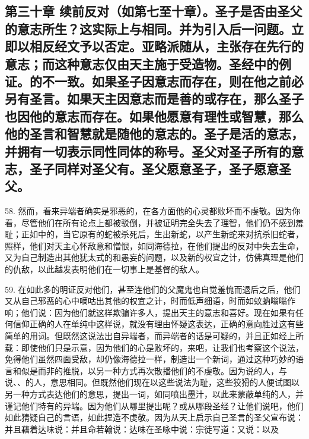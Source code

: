 
\subsection{第三十章 续前反对（如第七至十章）。圣子是否由圣父的意志所生？这实际上与相同。并为引入后一问题。立即以相反经文予以否定。亚略派随从，主张存在先行的意志；而这种意志仅由天主施于受造物。圣经中的例证。的不一致。如果圣子因意志而存在，则在他之前必另有圣言。如果天主因意志而是善的或存在，那么圣子也因他的意志而存在。如果他愿意有理性或智慧，那么他的圣言和智慧就是随他的意志的。圣子是活的意志，并拥有一切表示同性同体的称号。圣父对圣子所有的意志，圣子同样对圣父有。圣父愿意圣子，圣子愿意圣父。}

58.  然而，看来异端者确实是邪恶的，在各方面他的心灵都败坏而不虔敬。因为你看，尽管他们在所有论点上都被驳倒，并被证明完全失去了理智，他们仍不感到羞耻；正如中的，当它原有的蛇被杀死后，生出新蛇，以产生新蛇来对抗杀旧蛇者，照样，他们对天主心怀敌意和憎恨，如同海德拉，在他们提出的反对中失去生命，又为自己制造出其他犹太式的和愚妄的问题，以及新的权宜之计，仿佛真理是他们的仇敌，以此越发表明他们在一切事上是基督的敌人。\par

59. 在如此多的明证反对他们，甚至连他们的父魔鬼也自觉羞愧而退后之后，他们又从自己邪恶的心中嘀咕出其他的权宜之计，时而低声细语，时而如蚊蚋嗡嗡作响；他们说：因为他们就这样欺骗许多人，提出天主的意志和喜好。现在如果有任何信仰正确的人在单纯中这样说，就没有理由怀疑这表达，正确的意向胜过这有些简单的用词。但既然这说法出自异端者，而异端者的话是可疑的，并且正如经上所载：即使他们只是示意，因为他们的心是败坏的，来吧，让我们也考察这个说法，免得他们虽然四面受敌，却仍像海德拉一样，制造出一个新词，通过这种巧妙的语言和似是而非的推脱，以另一种方式再次散播他们的不虔敬。因为说的人，与说、、的人，意思相同。但既然他们现在以这些说法为耻，这些狡猾的人便试图以另一种方式表达他们的意思，提出一词，如同喷出墨汁，以此来蒙蔽单纯的人，并谨记他们特有的异端。因为他们从哪里提出呢？或从哪段圣经？让他们说吧，他们如此猜疑自己的言语，如此捏造不虔敬。因为从天上启示自己圣言的圣父宣布说：并且藉着达味说：并且命若翰说：达味在圣咏中说：宗徒写道：又说：以及\par

